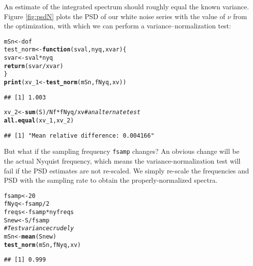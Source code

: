 \documentclass[10pt]{article}\usepackage[]{graphicx}\usepackage[]{color}
\makeatletter
\newcommand{\hlnum}[1]{\textcolor[rgb]{0.686,0.059,0.569}{#1}}%
\newcommand{\hlcom}[1]{\textcolor[rgb]{0.678,0.584,0.686}{\textit{#1}}}%
\newcommand{\hlopt}[1]{\textcolor[rgb]{0,0,0}{#1}}%
\newcommand{\hlstd}[1]{\textcolor[rgb]{0.345,0.345,0.345}{#1}}%
\newcommand{\hlkwa}[1]{\textcolor[rgb]{0.161,0.373,0.58}{\textbf{#1}}}%
\newcommand{\hlkwb}[1]{\textcolor[rgb]{0.69,0.353,0.396}{#1}}%
\newcommand{\hlkwc}[1]{\textcolor[rgb]{0.333,0.667,0.333}{#1}}%
\newcommand{\hlkwd}[1]{\textcolor[rgb]{0.737,0.353,0.396}{\textbf{#1}}}%
\newenvironment{kframe}{%
 \def\at@end@of@kframe{}%
 \ifinner\ifhmode%
  \def\at@end@of@kframe{\end{minipage}}%
  \begin{minipage}{\columnwidth}%
 \fi\fi%
 \def\FrameCommand##1{\hskip\@totalleftmargin \hskip-\fboxsep
 \colorbox{shadecolor}{##1}\hskip-\fboxsep
     \hskip-\linewidth \hskip-\@totalleftmargin \hskip\columnwidth}%
 \MakeFramed {\advance\hsize-\width
   \@totalleftmargin\z@ \linewidth\hsize
   \@setminipage}}%
 {\par\unskip\endMakeFramed%
 \at@end@of@kframe}
\newenvironment{knitrout}{}{} %
\makeatother
\begin{document}
An estimate of the integrated spectrum
should roughly equal the known variance.
Figure \ref{fig:psdN} plots the PSD of our white noise series with
the value of $\nu$ from the optimization, 
with which we can perform a variance--normalization
test:
\begin{knitrout}
\color{fgcolor}\begin{kframe}
\begin{alltt}
\hlstd{mSn} \hlkwb{<-} \hlstd{dof}
\hlstd{test_norm} \hlkwb{<-} \hlkwa{function}\hlstd{(}\hlkwc{sval}\hlstd{,} \hlkwc{nyq}\hlstd{,} \hlkwc{xvar}\hlstd{) \{}
    \hlstd{svar} \hlkwb{<-} \hlstd{sval} \hlopt{*} \hlstd{nyq}
    \hlkwd{return}\hlstd{(svar}\hlopt{/}\hlstd{xvar)}
\hlstd{\}}
\hlkwd{print}\hlstd{(xv_1} \hlkwb{<-} \hlkwd{test_norm}\hlstd{(mSn, fNyq, xv))}
\end{alltt}
\begin{verbatim}
## [1] 1.003
\end{verbatim}
\begin{alltt}
\hlstd{xv_2} \hlkwb{<-} \hlkwd{sum}\hlstd{(S)}\hlopt{/}\hlstd{Nf} \hlopt{*} \hlstd{fNyq}\hlopt{/}\hlstd{xv}  \hlcom{# an alternate test}
\hlkwd{all.equal}\hlstd{(xv_1, xv_2)}
\end{alltt}
\begin{verbatim}
## [1] "Mean relative difference: 0.004166"
\end{verbatim}
\end{kframe}
\end{knitrout}


But what if the sampling frequency \texttt{fsamp} changes? An obvious change will be
the actual Nyquist frequency, which means the variance-normalization test will
fail if the PSD estimates are not re-scaled.  We simply re-scale the frequencies
and PSD
with the sampling rate
to obtain the properly-normalized spectra.

\begin{knitrout}
\color{fgcolor}\begin{kframe}
\begin{alltt}
\hlstd{fsamp} \hlkwb{<-} \hlnum{20}
\hlstd{fNyq} \hlkwb{<-} \hlstd{fsamp}\hlopt{/}\hlnum{2}
\hlstd{freqs} \hlkwb{<-} \hlstd{fsamp} \hlopt{*} \hlstd{nyfreqs}
\hlstd{Snew} \hlkwb{<-} \hlstd{S}\hlopt{/}\hlstd{fsamp}
\hlcom{# Test variance crudely}
\hlstd{mSn} \hlkwb{<-} \hlkwd{mean}\hlstd{(Snew)}
\hlkwd{test_norm}\hlstd{(mSn, fNyq, xv)}
\end{alltt}
\begin{verbatim}
## [1] 0.999
\end{verbatim}
\end{kframe}
\end{knitrout}
\end{document}

